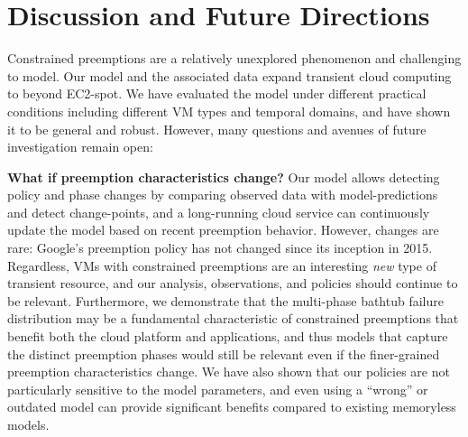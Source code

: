 \vspace*{\subsecspace}
\section{Discussion and Future Directions}
\label{sec:discussion}


Constrained preemptions are a relatively unexplored phenomenon and challenging to model.
Our model and the associated data expand transient cloud computing to beyond EC2-spot.
We have evaluated the model under different practical conditions including different VM types and temporal domains, and have shown it to be general and robust. 
However, many questions and avenues of future investigation remain open:

\noindent \textbf{What if preemption characteristics change?}
Our model allows detecting policy and phase changes by comparing observed data with model-predictions and detect change-points, and 
a long-running cloud service can continuously update the model based on recent preemption behavior. 
However, changes are rare: Google's preemption policy has not changed since its inception in 2015. 
%
Regardless, VMs with constrained preemptions are an interesting \emph{new} type of transient resource, and our analysis, observations, and policies should continue to be relevant. 
Furthermore, we demonstrate that the multi-phase bathtub failure distribution may be a fundamental characteristic of constrained preemptions that benefit both the cloud platform and applications, and thus models that capture the distinct preemption phases would still be relevant even if the finer-grained preemption characteristics change. %
%
We have also shown that our policies are not particularly sensitive to the model parameters, and even using a ``wrong'' or outdated model can provide significant benefits compared to existing memoryless models. 

